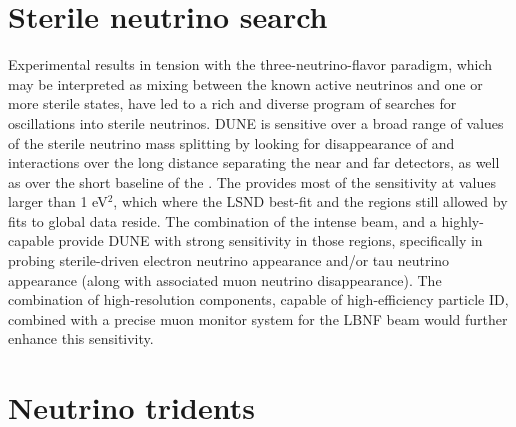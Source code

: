\section{Sterile neutrino search}
\label{ssec:exsum-nd-BSMappendix-sterileneutrinos}

Experimental results in tension with the three-neutrino-flavor paradigm, which may be interpreted as mixing between the known active neutrinos and one or more sterile states, have led to a rich and diverse program of searches for oscillations into sterile neutrinos.  DUNE is sensitive over a broad range of values of the sterile neutrino mass splitting by looking for disappearance of  and  interactions over the long distance separating the near and far detectors, as well as over the short baseline of the . The  provides most of the sensitivity at values larger than 1 eV$^{2}$, which where the LSND best-fit and the regions still allowed by fits to global data reside. The combination of the intense  beam, and a highly-capable  provide DUNE with strong sensitivity in those regions, specifically in probing sterile-driven electron neutrino appearance and/or tau neutrino appearance (along with associated muon neutrino disappearance). The combination of high-resolution  components, capable of high-efficiency particle ID, combined with a precise muon monitor system for the LBNF beam would further enhance this sensitivity. 

\section{Neutrino tridents}
\label{ssec:exsum-nd-BSMappendix-tridents}

